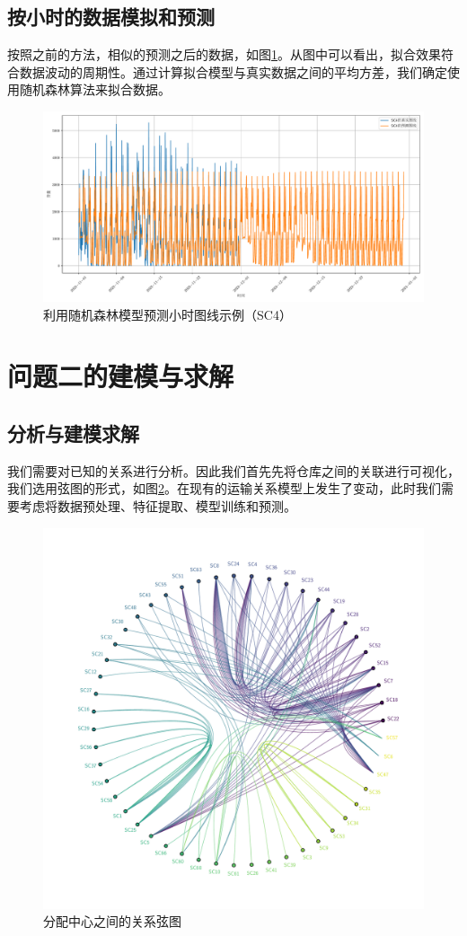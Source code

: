 \documentclass[UTF8]{article}%
\begin{document}
\subsection{按小时的数据模拟和预测}
按照之前的方法，相似的预测之后的数据，如图\ref{SC4_2}。从图中可以看出，拟合效果符合数据波动的周期性。通过计算拟合模型与真实数据之间的平均方差，我们确定使用随机森林算法来拟合数据。

\begin{figure}[!ht]
	\centering
	\includegraphics*[width=0.9\linewidth]{images/SC_4_2.pdf}
	\caption{利用随机森林模型预测小时图线示例（SC4）}
	\label{SC4_2}
\end{figure}


\section{问题二的建模与求解}
\subsection{分析与建模求解}
我们需要对已知的关系进行分析。因此我们首先先将仓库之间的关联进行可视化，我们选用弦图的形式，如图\ref{xt}。在现有的运输关系模型上发生了变动，此时我们需要考虑将数据预处理、特征提取、模型训练和预测。
\begin{figure}[!t]
	\centering
	\includegraphics*[width=0.8\linewidth]{images/xuantu.pdf}
	\caption{分配中心之间的关系弦图}
	\label{xt}
\end{figure}
\end{document}
